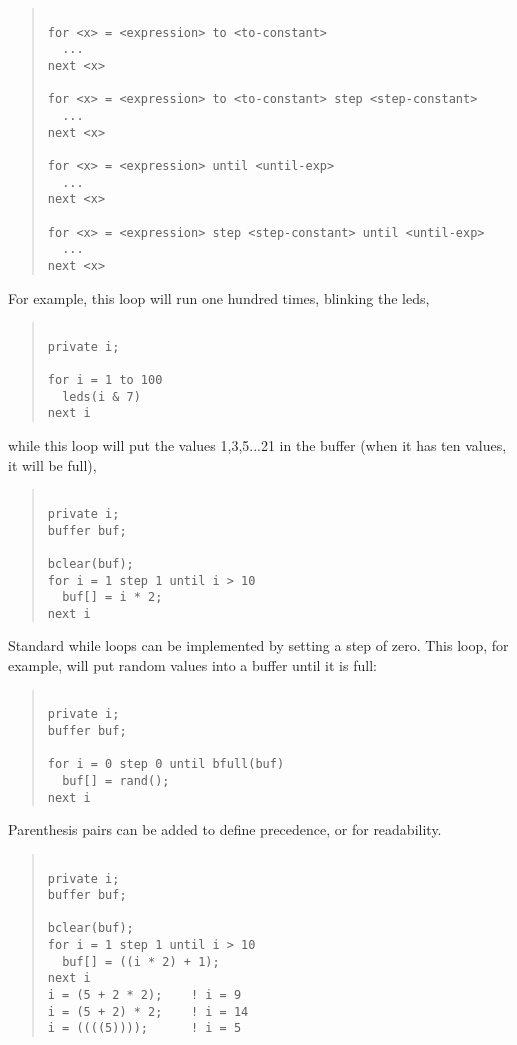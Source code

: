\documentclass[12pt]{article}
\begin{document}
\begin{quotation}
\begin{verbatim}

for <x> = <expression> to <to-constant>
  ...
next <x>

for <x> = <expression> to <to-constant> step <step-constant>
  ...
next <x>

for <x> = <expression> until <until-exp>
  ...
next <x>

for <x> = <expression> step <step-constant> until <until-exp>
  ...
next <x>

\end{verbatim}
\end{quotation}

For example, this loop will run one hundred times, blinking the leds,

\begin{quotation}
\begin{verbatim}

private i;

for i = 1 to 100
  leds(i & 7)
next i
\end{verbatim}
\end{quotation}

while this loop will put the values 1,3,5...21 in the buffer (when it has
ten values, it will be full),

\begin{quotation}
\begin{verbatim}

private i;
buffer buf;

bclear(buf);
for i = 1 step 1 until i > 10
  buf[] = i * 2;
next i
\end{verbatim}
\end{quotation}

Standard while loops can be implemented by setting a step of
zero. This loop, for example, will put random values into a buffer
until it is full:

\begin{quotation}
\begin{verbatim}

private i;
buffer buf;

for i = 0 step 0 until bfull(buf)
  buf[] = rand();
next i
\end{verbatim}
\end{quotation}

Parenthesis pairs can be added to define precedence, or for readability.

\begin{quotation}
\begin{verbatim}

private i;
buffer buf;

bclear(buf);
for i = 1 step 1 until i > 10
  buf[] = ((i * 2) + 1);
next i
i = (5 + 2 * 2);    ! i = 9
i = (5 + 2) * 2;    ! i = 14
i = ((((5))));      ! i = 5

\end{verbatim}
\end{quotation}
\end{document}
